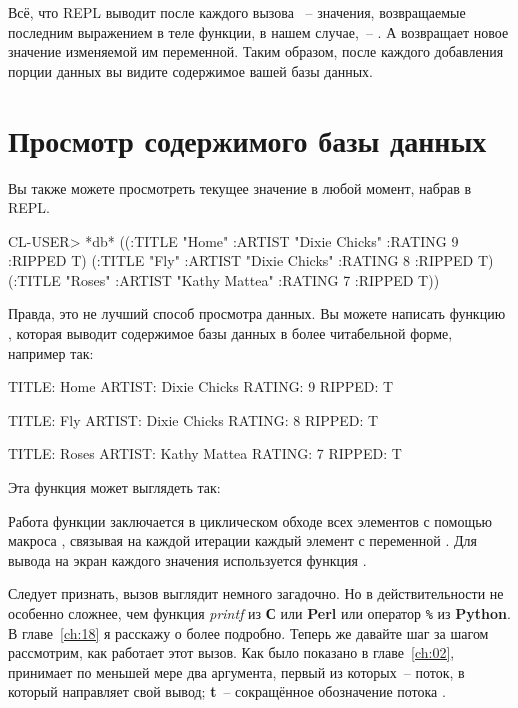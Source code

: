 Всё, что REPL выводит после каждого вызова ~-- значения, возвращаемые
последним выражением в теле функции, в нашем случае,~-- . А 
возвращает новое значение изменяемой им переменной. Таким образом, после каждого
добавления порции данных вы видите содержимое вашей базы данных.

\section{Просмотр содержимого базы данных}

Вы также можете просмотреть текущее значение  в любой момент,
набрав  в REPL.

\begin{myverb}
  CL-USER> *db*
  ((:TITLE "Home" :ARTIST "Dixie Chicks" :RATING 9 :RIPPED T)
   (:TITLE "Fly" :ARTIST "Dixie Chicks" :RATING 8 :RIPPED T)
   (:TITLE "Roses" :ARTIST "Kathy Mattea" :RATING 7 :RIPPED T))
\end{myverb}

Правда, это не лучший способ просмотра данных. Вы можете написать функцию ,
которая выводит содержимое базы данных в более читабельной форме, например так:

\begin{myverb}
   TITLE:    Home
   ARTIST:   Dixie Chicks
   RATING:   9
   RIPPED:   T
   
   TITLE:    Fly
   ARTIST:   Dixie Chicks
   RATING:   8
   RIPPED:   T
   
   TITLE:    Roses
   ARTIST:   Kathy Mattea
   RATING:   7
   RIPPED:   T
\end{myverb}

Эта функция может выглядеть так:


Работа функции заключается в циклическом обходе всех элементов  с помощью макроса
, связывая на каждой итерации каждый элемент с переменной . Для
вывода на экран каждого значения  используется функция .

Следует признать, вызов  выглядит немного загадочно. Но в действительности
 не особенно сложнее, чем функция \textit{printf} из \textbf{С} или
\textbf{Perl} или оператор \lstinline{%} из \textbf{Python}. В главе~\ref{ch:18} я расскажу о
 более подробно. Теперь же давайте шаг за шагом рассмотрим, как работает этот
вызов. Как было показано в главе~\ref{ch:02},  принимает по меньшей мере два аргумента,
первый из которых~-- поток, в который  направляет свой вывод; \textbf{t}~--
сокращённое обозначение потока .

